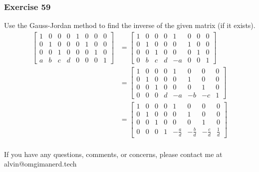 \documentclass[letterpaper, 12pt]{math}
\begin{document}
\subsubsection*{Exercise 59}
Use the Gauss-Jordan method to find the inverse of the given matrix (if it
exists).
\begin{align*}
  \begin{bmatrix}
    1 & 0 & 0 & 0 & 1 & 0 & 0 & 0 \\
    0 & 1 & 0 & 0 & 0 & 1 & 0 & 0 \\
    0 & 0 & 1 & 0 & 0 & 0 & 1 & 0 \\
    a & b & c & d & 0 & 0 & 0 & 1
  \end{bmatrix} &= \begin{bmatrix}
    1 & 0 & 0 & 0 & 1 & 0 & 0 & 0 \\
    0 & 1 & 0 & 0 & 0 & 1 & 0 & 0 \\
    0 & 0 & 1 & 0 & 0 & 0 & 1 & 0 \\
    0 & b & c & d & -a & 0 & 0 & 1
  \end{bmatrix} \\
  &= \begin{bmatrix}
    1 & 0 & 0 & 0 & 1 & 0 & 0 & 0 \\
    0 & 1 & 0 & 0 & 0 & 1 & 0 & 0 \\
    0 & 0 & 1 & 0 & 0 & 0 & 1 & 0 \\
    0 & 0 & 0 & d & -a & -b & -c & 1
  \end{bmatrix} \\
  &= \begin{bmatrix}
    1 & 0 & 0 & 0 & 1 & 0 & 0 & 0 \\
    0 & 1 & 0 & 0 & 0 & 1 & 0 & 0 \\
    0 & 0 & 1 & 0 & 0 & 0 & 1 & 0 \\
    0 & 0 & 0 & 1 & -\frac{a}{d} & -\frac{b}{d} & -\frac{c}{d} & \frac{1}{d}
  \end{bmatrix} \\
\end{align*}

\begin{center}
  If you have any questions, comments, or concerns, please contact me at
  alvin@omgimanerd.tech
\end{center}
\end{document}
